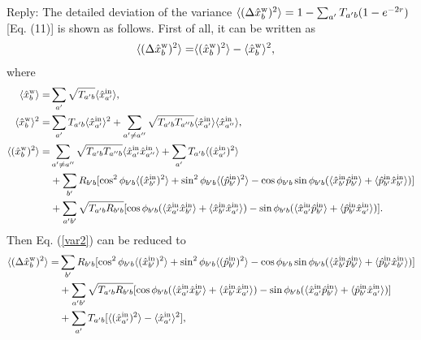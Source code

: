 \documentclass[10pt]{article}
\begin{document}
Reply: 
The detailed deviation of the variance $\langle (\Delta \hat{x}_b^{\rm{w}})^2\rangle= 1- \sum_{a'} T_{a'b} (1 - e^{-2r})$ [Eq. (11)] is shown as follows. First of all, it can be written as
\begin{align}
\label{var2}
\langle (\Delta \hat{x}^{\rm{w}}_b)^2 \rangle =&  \langle (\hat{x}^{\rm{w}}_b)^2 \rangle - \langle \hat{x}^{\rm{w}}_b \rangle^2,
\end{align}
where
\begin{align}
\langle \hat{x}_b^{\rm{w}} \rangle =& \sum_{a'}{\sqrt{T_{a'b}}  \langle \hat{x}_{a'}^{\rm{in}} \rangle}, \nonumber\\ \nonumber
\langle \hat{x}_b^{\rm{w}} \rangle^2 =& \sum_{a'} {T_{a'b} \langle\hat{x}_{a'}^{\rm{in}} \rangle^2 } + \sum_{a'\neq a''}  \sqrt{T_{a'b} T_{a''b}}   \langle\hat{x}_{a'}^{\rm{in}} \rangle \langle\hat{x}_{a''}^{\rm{in}}\rangle,\\ \nonumber
\langle (\hat{x}_b^{\rm{w}})^2 \rangle  =&  \sum_{a'\neq a''}  \sqrt{T_{a'b} T_{a''b}}   \langle\hat{x}_{a'}^{\rm{in}} \hat{x}_{a''}^{\rm{in}}\rangle  + \sum_{a'} {T_{a'b} \langle(\hat{x}_{a'}^{\rm{in}})^2 \rangle } \\ \nonumber
& +  \sum_{b'} R_{b'b}  [\cos^2 \phi_{b'b}  \langle(\hat{x}_{b'}^{\rm{in}})^2\rangle  + \sin^2 \phi_{b'b}  \langle(\hat{p}_{b'}^{\rm{in}})^2\rangle - \cos \phi_{b'b} \sin \phi_{b'b} ( \langle\hat{x}_{b'}^{\rm{in}} \hat{p}_{b'}^{\rm{in}}\rangle +  \langle\hat{p}_{b'}^{\rm{in}} \hat{x}_{b'}^{\rm{in}}\rangle )  ] \\ \nonumber
&+ \sum_{a' b'}\sqrt{T_{a'b} R_{b'b}} [\cos \phi_{b'b} (\langle\hat{x}_{a'}^{\rm{in}} \hat{x}_{b'}^{\rm{in}}\rangle + \langle\hat{x}_{b'}^{\rm{in}} \hat{x}_{a'}^{\rm{in}}\rangle) - \sin \phi_{b'b} (\langle\hat{x}_{a'}^{\rm{in}} \hat{p}_{b'}^{\rm{in}}\rangle + \langle\hat{p}_{b'}^{\rm{in}} \hat{x}_{a'}^{\rm{in}}\rangle)].
\end{align}
Then Eq. (\ref{var2}) can be reduced to
\begin{align}
\label{var2b}
\langle (\Delta \hat{x}^{\rm{w}}_b)^2 \rangle =&   \sum_{b'} R_{b'b}  [\cos^2 \phi_{b'b}  \langle(\hat{x}_{b'}^{\rm{in}})^2\rangle  + \sin^2 \phi_{b'b}  \langle(\hat{p}_{b'}^{\rm{in}})^2\rangle 
- \cos \phi_{b'b} \sin \phi_{b'b} ( \langle\hat{x}_{b'}^{\rm{in}} \hat{p}_{b'}^{\rm{in}}\rangle +  \langle\hat{p}_{b'}^{\rm{in}} \hat{x}_{b'}^{\rm{in}}\rangle )  ] \\ \nonumber
&+ \sum_{a' b'}\sqrt{T_{a'b} R_{b'b}} [\cos \phi_{b'b} (\langle\hat{x}_{a'}^{\rm{in}} \hat{x}_{b'}^{\rm{in}}\rangle + \langle\hat{x}_{b'}^{\rm{in}} \hat{x}_{a'}^{\rm{in}}\rangle) - \sin \phi_{b'b} (\langle\hat{x}_{a'}^{\rm{in}} \hat{p}_{b'}^{\rm{in}}\rangle + \langle\hat{p}_{b'}^{\rm{in}} \hat{x}_{a'}^{\rm{in}}\rangle)] \\ \nonumber
& + \sum_{a'} T_{a'b} [\langle(\hat{x}_{a'}^{\rm{in}})^2 \rangle - \langle\hat{x}_{a'}^{\rm{in}} \rangle^2],\\ \nonumber
\end{align}
\end{document}
